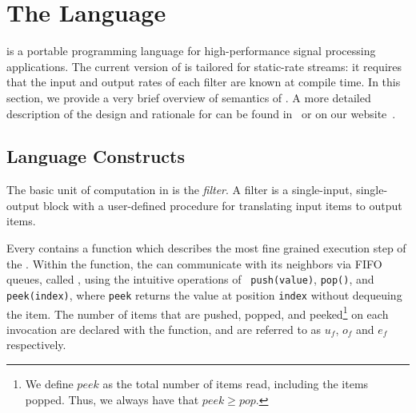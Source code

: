 \section{The \StreamIt Language}
\label{sec:streamit}

\StreamIt is a portable programming language for high-performance
signal processing applications.  The current version of \StreamIt
is tailored for static-rate streams: it requires that the input
and output rates of each filter are known at compile time.  In
this section, we provide a very brief overview of
semantics of \StreamIt.  A more detailed description of the design
and rationale for \StreamIt can be found in~\cite{thies02streamit} or
on our website~\cite{streamitweb}.

\subsection{Language Constructs}

The basic unit of computation in \StreamIt is the {\it filter}.  A
filter is a single-input, single-output block with a user-defined
procedure for translating input items to output items.
\begin{comment}
An example of a filter is the {\tt FIRFilter}, a component of our
software radio (see Figure \ref{fig:radiocode}). Each filter
contains an {\tt init} function that is called at initialization
time; in this case, the {\tt FIRFilter} calculates {\tt weights},
which represents its impulse response.
\end{comment}
Every \filter contains a \work function which describes the most
fine grained execution step of the \filter. Within the \work
function, the \filter can communicate with its neighbors via FIFO
queues, called \Channels, using the intuitive operations of {\tt
push(value)}, {\tt pop()}, and {\tt peek(index)}, where {\tt peek}
returns the value at position {\tt index} without dequeuing the
item.  The number of items that are pushed, popped, and
peeked\footnote{We define $peek$ as the total number of items
read, including the items popped.  Thus, we always have that $peek
\ge pop$.} on each invocation are declared with the \work
function, and are referred to as $u_f$, $o_f$ and $e_f$
respectively.

\begin{comment}
In addition to {\tt work}, a filter can contain a {\tt prework}
function that is executed exactly once between initialization and
the steady-state.  Like {\tt work}, {\tt prework} can access the
input and output tapes of the filter; however, the I/O rates of
{\tt work} and {\tt prework} can differ. In an {\tt FIRFilter}, a
{\tt prework} function is essential for correctly filtering the
beginning of the input stream.  The user never calls the {\tt
init}, {\tt prework}, and {\tt work} functions--they are all
called automatically.
\end{comment}

